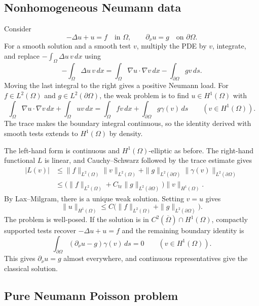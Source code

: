 \documentclass[11pt,a4paper]{article}
\begin{document}
\subsection{Nonhomogeneous Neumann data}

Consider
\[
  -\Delta u+u=f\quad\text{in }\Omega,\qquad
  \partial_\nu u=g\quad\text{on }\partial\Omega.
\]
For a smooth solution and a smooth test \(v\), multiply
the PDE by \(v\), integrate, and replace
\(-\int_\Omega \Delta u\,v\,dx\) using
\[
  -\int_\Omega\Delta u\,v\,dx
   =\int_\Omega\nabla u\cdot\nabla v\,dx
      -\int_{\partial\Omega}g v\,ds .
\]
Moving the last integral to the right gives a positive
Neumann load. For \(f\in L^2(\Omega)\) and
\(g\in L^2(\partial\Omega)\), the weak problem is to find
\(u\in H^1(\Omega)\) with
\begin{equation}
  \int_\Omega\nabla u\cdot\nabla v\,dx+\int_\Omega uv\,dx
  =\int_\Omega f v\,dx+\int_{\partial\Omega}g\gamma(v)\,ds
  \qquad(v\in H^1(\Omega)).
  \label{eq:l7-neumann-data}
\end{equation}
The trace makes the boundary integral continuous, so the
identity derived with smooth tests extends to \(H^1(\Omega)\)
by density.

The left-hand form is continuous and \(H^1(\Omega)\)-elliptic
as before. The right-hand functional \(L\) is linear, and
Cauchy--Schwarz followed by the trace estimate gives
\begin{align*}
  |L(v)|
  &\le\|f\|_{L^2(\Omega)}\|v\|_{L^2(\Omega)}
      +\|g\|_{L^2(\partial\Omega)}\|\gamma(v)\|_{L^2(\partial\Omega)}\\
  &\le\bigl(\|f\|_{L^2(\Omega)}
              +C_{\mathrm{tr}}\|g\|_{L^2(\partial\Omega)}\bigr)
       \|v\|_{H^1(\Omega)} .
\end{align*}
By Lax--Milgram, there is a unique weak solution. Setting \(v=u\)
gives
\[
  \|u\|_{H^1(\Omega)}
  \le C\bigl(\|f\|_{L^2(\Omega)}
             +\|g\|_{L^2(\partial\Omega)}\bigr).
\]
The problem is well-posed. If the solution is in
\(C^2(\overline\Omega)\cap H^1(\Omega)\), compactly supported
tests recover \(-\Delta u+u=f\) and the remaining boundary
identity is
\[
  \int_{\partial\Omega}(\partial_\nu u-g)\gamma(v)\,ds=0
  \qquad(v\in H^1(\Omega)).
\]
This gives \(\partial_\nu u=g\) almost everywhere, and
continuous representatives give the classical solution.

\subsection{Pure Neumann Poisson problem}
\end{document}
